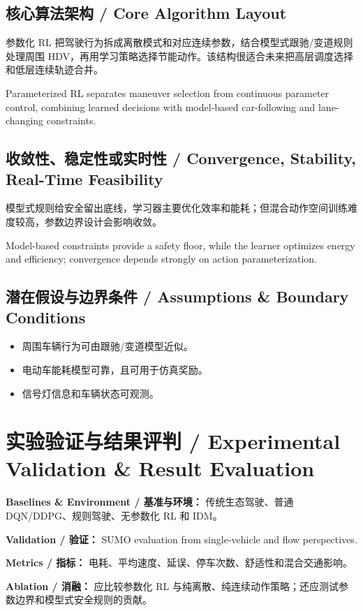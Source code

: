 \documentclass[UTF8,a4paper,11pt,fontset=fandol]{ctexart}
\begin{document}
\subsection{核心算法架构 / Core Algorithm Layout}
参数化 RL 把驾驶行为拆成离散模式和对应连续参数，结合模型式跟驰/变道规则处理周围 HDV，再用学习策略选择节能动作。该结构很适合未来把高层调度选择和低层连续轨迹合并。

Parameterized RL separates maneuver selection from continuous parameter control, combining learned decisions with model-based car-following and lane-changing constraints.

\subsection{收敛性、稳定性或实时性 / Convergence, Stability, Real-Time Feasibility}
模型式规则给安全留出底线，学习器主要优化效率和能耗；但混合动作空间训练难度较高，参数边界设计会影响收敛。

Model-based constraints provide a safety floor, while the learner optimizes energy and efficiency; convergence depends strongly on action parameterization.

\subsection{潜在假设与边界条件 / Assumptions \& Boundary Conditions}
\begin{itemize}
\item 周围车辆行为可由跟驰/变道模型近似。
\item 电动车能耗模型可靠，且可用于仿真奖励。
\item 信号灯信息和车辆状态可观测。
\end{itemize}


\section{实验验证与结果评判 / Experimental Validation \& Result Evaluation}
\textbf{Baselines \& Environment / 基准与环境：} 传统生态驾驶、普通 DQN/DDPG、规则驾驶、无参数化 RL 和 IDM。

\textbf{Validation / 验证：} SUMO evaluation from single-vehicle and flow perspectives.

\textbf{Metrics / 指标：} 电耗、平均速度、延误、停车次数、舒适性和混合交通影响。

\textbf{Ablation / 消融：} 应比较参数化 RL 与纯离散、纯连续动作策略；还应测试参数边界和模型式安全规则的贡献。
\end{document}
